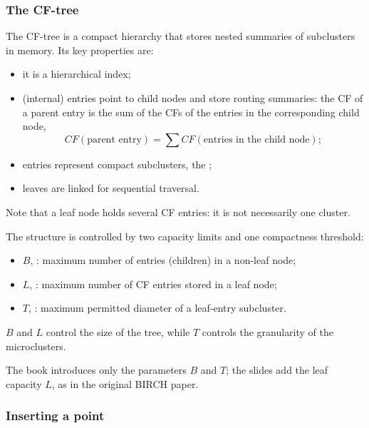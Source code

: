 \subsubsection{The CF-tree}

The CF-tree is a compact hierarchy that stores nested summaries of subclusters in memory. Its key properties are:
\begin{itemize}
  \item it is a  hierarchical index;
  \item {} (internal) entries point to child nodes and store routing summaries: the CF of a parent entry is the sum of the CFs of the entries in the corresponding child node,
  \[
  CF(\text{parent entry}) = \sum CF(\text{entries in the child node});
  \]
  \item {} entries represent compact subclusters, the ;
  \item leaves are linked for sequential traversal.
\end{itemize}
Note that a leaf node holds several CF entries: it is not necessarily one cluster.

The structure is controlled by two capacity limits and one compactness threshold:
\begin{itemize}
  \item $B$, : maximum number of entries (children) in a non-leaf node;
  \item $L$, : maximum number of CF entries stored in a leaf node;
  \item $T$, : maximum permitted diameter of a leaf-entry subcluster.
\end{itemize}
$B$ and $L$ control the size of the tree, while $T$ controls the granularity of the microclusters.

\begin{remark}
The book introduces only the parameters $B$ and $T$; the slides add the leaf capacity $L$, as in the original BIRCH paper.
\end{remark}

\subsubsection{Inserting a point}

